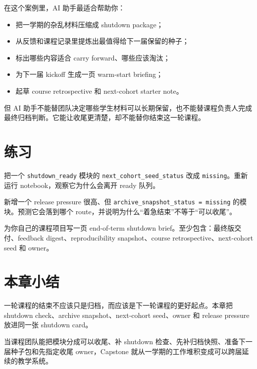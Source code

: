 在这个案例里，AI 助手最适合帮助你：

\begin{itemize}
    \item 把一学期的杂乱材料压缩成 shutdown package；
    \item 从反馈和课程记录里提炼出最值得给下一届保留的种子；
    \item 标出哪些内容适合 carry forward、哪些应该淘汰；
    \item 为下一届 kickoff 生成一页 warm-start briefing；
    \item 起草 course retrospective 和 next-cohort starter note。
\end{itemize}

但 AI 助手不能替团队决定哪些学生材料可以长期保留，也不能替课程负责人完成最终归档判断。它能让收尾更清楚，却不能替你结束这一轮课程。

\section{练习}

\begin{exercisebox}[基础练习]
把一个 \texttt{shutdown\_ready} 模块的 \texttt{next\_cohort\_seed\_status} 改成 \texttt{missing}。重新运行 notebook，观察它为什么会离开 ready 队列。
\end{exercisebox}

\begin{exercisebox}[进阶练习]
新增一个 release pressure 很高、但 \texttt{archive\_snapshot\_status = missing} 的模块。预测它会落到哪个 route，并说明为什么“着急结束”不等于“可以收尾”。
\end{exercisebox}

\begin{exercisebox}[开放练习]
为你自己的课程项目写一页 end-of-term shutdown brief。至少包含：最终版交付、feedback digest、reproducibility snapshot、course retrospective、next-cohort seed 和 owner。
\end{exercisebox}

\section{本章小结}

一轮课程的结束不应该只是归档，而应该是下一轮课程的更好起点。本章把 shutdown check、archive snapshot、next-cohort seed、owner 和 release pressure 放进同一张 shutdown card。

当课程团队能把模块分成可以收尾、补 shutdown 检查、先补归档快照、准备下一届种子包和先指定收尾 owner，Capstone 就从一学期的工作堆积变成可以跨届延续的教学系统。
